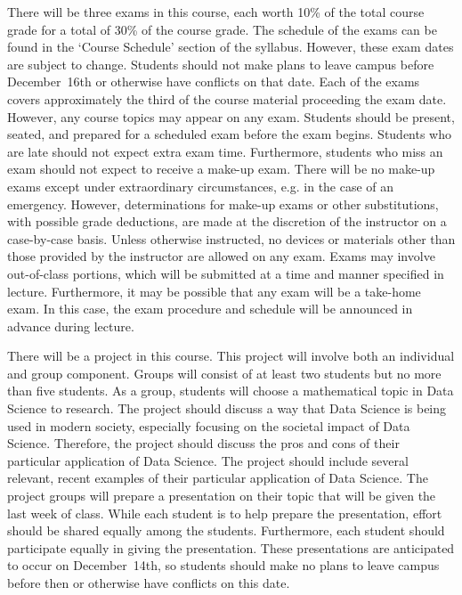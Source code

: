 \documentclass[11pt,letterpaper]{article}
\begin{document}
There will be three exams in this course, each worth 10\% of the total course grade for a total of 30\% of the course grade. The schedule of the exams can be found in the `Course Schedule' section of the syllabus. However, these exam dates are subject to change. Students should not make plans to leave campus before December~16th or otherwise have conflicts on that date. Each of the exams covers approximately the third of the course material proceeding the exam date. However, any course topics may appear on any exam. Students should be present, seated, and prepared for a scheduled exam before the exam begins. Students who are late should not expect extra exam time. Furthermore, students who miss an exam should not expect to receive a make-up exam. There will be no make-up exams except under extraordinary circumstances, e.g. in the case of an emergency. However, determinations for make-up exams or other substitutions, with possible grade deductions, are made at the discretion of the instructor on a case-by-case basis. Unless otherwise instructed, no devices or materials other than those provided by the instructor are allowed on any exam. Exams may involve out-of-class portions, which will be submitted at a time and manner specified in lecture. Furthermore, it may be possible that any exam will be a take-home exam. In this case, the exam procedure and schedule will be announced in advance during lecture. 
\sectionbreak



There will be a project in this course. This project will involve both an individual and group component. Groups will consist of at least two students but no more than five students. As a group, students will choose a mathematical topic in Data Science to research. The project should discuss a way that Data Science is being used in modern society, especially focusing on the societal impact of Data Science. Therefore, the project should discuss the pros and cons of their particular application of Data Science. The project should include several relevant, recent examples of their particular application of Data Science. The project groups will prepare a presentation on their topic that will be given the last week of class. While each student is to help prepare the presentation, effort should be shared equally among the students. Furthermore, each student should participate equally in giving the presentation. These presentations are anticipated to occur on December~14th, so students should make no plans to leave campus before then or otherwise have conflicts on this date. \pspace
\end{document}
